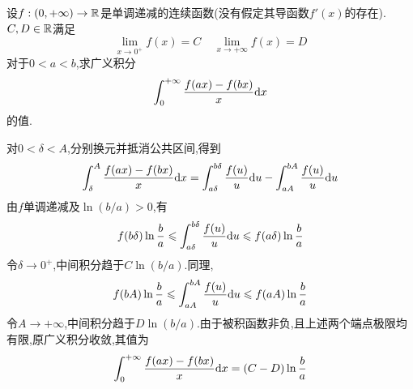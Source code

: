 \documentclass{ctexart}
\begin{document}
\begin{problem}[7.(10\songti{分})]
设$f:(0,+\infty)\to\mathbb{R}$是单调递减的连续函数(没有假定其导函数$f'(x)$的存在).%
        $C,D\in\mathbb{R}$满足
        \[\lim_{x\to0^+}f(x)=C\ \ \ \ \ \lim_{x\to+\infty}f(x)=D\]
        对于$0<a<b$,求广义积分
        \[\int_0^{+\infty}\dfrac{f(ax)-f(bx)}{x}\mathrm{d} x\]
        的值.
\end{problem}
\begin{solution}
对$0<\delta<A$,分别换元并抵消公共区间,得到
\[\int_\delta^A\frac{f(ax)-f(bx)}x\mathrm{d} x
=\int_{a\delta}^{b\delta}\frac{f(u)}u\mathrm{d} u-
\int_{aA}^{bA}\frac{f(u)}u\mathrm{d} u\]
由$f$单调递减及$\ln(b/a)>0$,有
\[f(b\delta)\ln\frac ba\leqslant
\int_{a\delta}^{b\delta}\frac{f(u)}u\mathrm{d} u
\leqslant f(a\delta)\ln\frac ba\]
令$\delta\to0^+$,中间积分趋于$C\ln(b/a)$.同理,
\[f(bA)\ln\frac ba\leqslant\int_{aA}^{bA}\frac{f(u)}u\mathrm{d} u
\leqslant f(aA)\ln\frac ba\]
令$A\to+\infty$,中间积分趋于$D\ln(b/a)$.由于被积函数非负,且上述两个端点极限均有限,原广义积分收敛,其值为
\[\int_0^{+\infty}\frac{f(ax)-f(bx)}x\mathrm{d} x=(C-D)\ln\frac ba\]
\end{solution}
\end{document}
